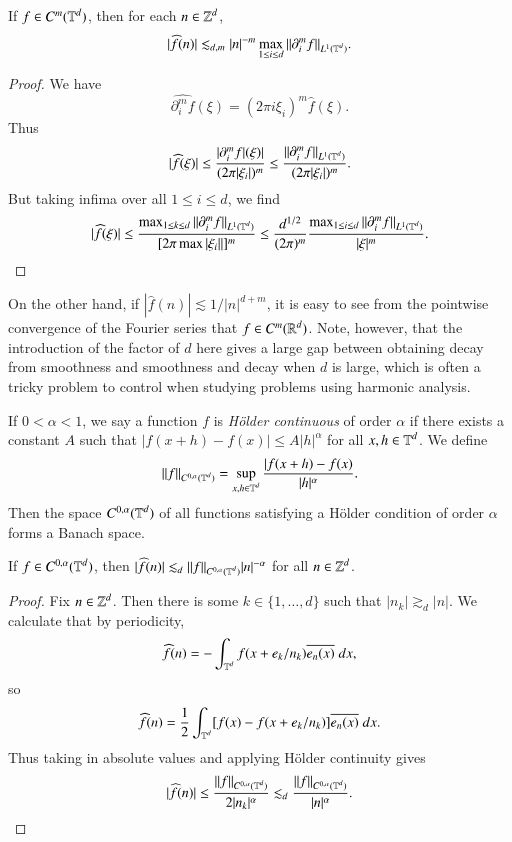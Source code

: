 \begin{theorem}
    If $f \in C^m(\operatorname{\mathbb{T}}^d)$, then for each $n \in \operatorname{\mathbb{Z}}^d$,
    \[ |\widehat{f}(n)| \lesssim_{d,m} |n|^{-m} \max_{1 \leq i \leq d} \| \partial_i^m f \|_{L^1(\operatorname{\mathbb{T}}^d)}. \]
\end{theorem}
\begin{proof}
    We have
    \[ \widehat{\partial_i^m f}(\xi) = (2 \pi i \xi_i)^m \widehat{f}(\xi). \]
    Thus
    \[ |\widehat{f}(\xi)| \leq \frac{|\partial_i^m f|(\xi)|}{(2\pi |\xi_i|)^m} \leq \frac{\| \partial_i^m f \|_{L^1(\operatorname{\mathbb{T}}^d)}}{(2 \pi |\xi_i|)^m}. \]
    But taking infima over all $1 \leq i \leq d$, we find
    \[ |\widehat{f}(\xi)| \leq \frac{\max_{1 \leq k \leq d} \| \partial_i^m f \|_{L^1(\operatorname{\mathbb{T}}^d)}}{[2 \pi \max |\xi_i| |]^m} \leq \frac{d^{1/2}}{(2\pi)^m} \frac{\max_{1 \leq i \leq d} \| \partial_i^m f \|_{L^1(\operatorname{\mathbb{T}}^d)}}{|\xi|^m}. \qedhere \]
\end{proof}

On the other hand, if $|\widehat{f}(n)| \lesssim 1/|n|^{d+m}$, it is easy to see from the pointwise convergence of the Fourier series that $f \in C^m(\operatorname{\mathbb{R}}^d)$. Note, however, that the introduction of the factor of $d$ here gives a large gap between obtaining decay from smoothness and smoothness and decay when $d$ is large, which is often a tricky problem to control when studying problems using harmonic analysis.

If $0 < \alpha < 1$, we say a function $f$ is \emph{H\"{o}lder continuous} of order $\alpha$ if there exists a constant $A$ such that $|f(x + h) - f(x)| \leq A |h|^\alpha$ for all $x, h \in \operatorname{\mathbb{T}}^d$. We define
%
\[ \| f \|_{C^{0,\alpha}(\operatorname{\mathbb{T}}^d)} = \sup_{x,h \in \operatorname{\mathbb{T}}^d} \frac{|f(x + h) - f(x)}{|h|^\alpha}. \]
%
Then the space $C^{0,\alpha}(\operatorname{\mathbb{T}}^d)$ of all functions satisfying a H\"{o}lder condition of order $\alpha$ forms a Banach space.

\begin{theorem}
    If $f \in C^{0,\alpha}(\operatorname{\mathbb{T}}^d)$, then $|\widehat{f}(n)| \lesssim_d \| f \|_{C^{0,\alpha}(\operatorname{\mathbb{T}}^d)} |n|^{-\alpha}$ for all $n \in \operatorname{\mathbb{Z}}^d$.
\end{theorem}
\begin{proof}
    Fix $n \in \operatorname{\mathbb{Z}}^d$. Then there is some $k \in \{ 1, \dots, d \}$ such that $|n_k| \gtrsim_d |n|$.  We calculate that by periodicity,
    \[ \widehat{f}(n) = - \int_{\operatorname{\mathbb{T}}^d} f(x + e_k/n_k) \overline{e_n(x)}\; dx, \]
    so
    \[ \widehat{f}(n) = \frac{1}{2} \int_{\operatorname{\mathbb{T}}^d} [f(x) - f(x + e_k/n_k)] \overline{e_n(x)}\; dx. \]
    Thus taking in absolute values and applying H\"{o}lder continuity gives
    \[ |\widehat{f}(n)| \leq \frac{\| f \|_{C^{0,\alpha}(\operatorname{\mathbb{T}}^d)}}{2 |n_k|^\alpha} \lesssim_d \frac{\| f \|_{C^{0,\alpha}(\operatorname{\mathbb{T}}^d)}}{|n|^\alpha}. \qedhere \]
\end{proof}

